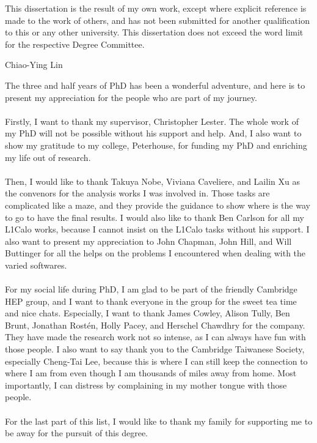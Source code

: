 \begin{declaration}
  This dissertation is the result of my own work, except where explicit
reference is made to the work of others, and has not been submitted
for another qualification to this or any other university. This
dissertation does not exceed the word limit for the respective Degree
Committee.
  \vspace*{1cm}
  \begin{flushright}
    Chiao-Ying Lin
  \end{flushright}
\end{declaration}


\begin{acknowledgements}
\noindent
The three and half years of PhD has been a wonderful adventure, and here is to present my appreciation for the people who are part of my journey.
\\
\\Firstly, I want to thank my supervisor, Christopher Lester. The whole work of my PhD will not be possible without his support and help. And, I also want to show my gratitude to my college, Peterhouse, for funding my PhD and enriching my life out of research. 
\\
\\Then, I would like to thank Takuya Nobe, Viviana Caveliere, and Lailin Xu as the convenors for the analysis works I was involved in. Those tasks are complicated like a maze, and they provide the guidance to show where is the way to go to have the final results. I would also like to thank Ben Carlson for all my L1Calo works, because I cannot insist on the L1Calo tasks without his support.  I also want to present my appreciation to John Chapman, John Hill, and Will Buttinger for all the helps on the problems I encountered when dealing with the varied softwares.
\\
\\For my social life during PhD, I am glad to be part of the friendly Cambridge HEP group, and I want to thank everyone in the group for the sweet tea time and nice chats. Especially, I want to thank James Cowley, Alison Tully, Ben Brunt, Jonathan Rostén, Holly Pacey, and Herschel Chawdhry for the company. They have made the research work not so intense, as I can always have fun with those people. I also want to say thank you to the Cambridge Taiwanese Society, especially Cheng-Tai Lee, because this is where I can still keep the connection to where I am from even though I am thousands of miles away from home. Most importantly, I can distress by complaining in my mother tongue with those people.
\\
\\For the last part of this list, I would like to thank my family for supporting me to be away for the pursuit of this degree. 

\end{acknowledgements}




